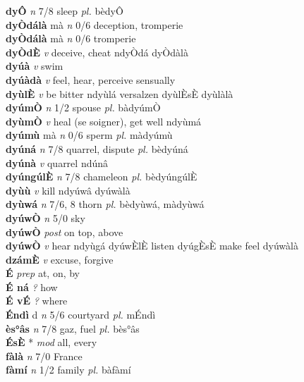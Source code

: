 \documentclass{article}
\newlength\cus
\begin{document}
{\bf dyÔ}  {\it n} 7/8 sleep {\it pl.} bèdyÔ         \\ 
{\bf dyÒdálà} mà {\it n} 0/6 deception, tromperie         \\ 
{\bf dyÒdálà} mà {\it n} 0/6 tromperie         \\ 
{\bf dyÒdÈ}  {\it v} deceive, cheat   ndyÒdá   dyÒdàlà   \\ 
{\bf dyúà}  {\it v} swim         \\ 
{\bf dyúàdà}  {\it v} feel, hear, perceive sensually         \\ 
{\bf dyùlÈ}  {\it v} be bitter   ndyùlá versalzen  dyùlÈsÈ dyùlàlà   \\ 
{\bf dyúmÒ}  {\it n} 1/2 spouse {\it pl.} bàdyúmÒ         \\ 
{\bf dyùmÒ}  {\it v} heal (se soigner), get well   ndyùmá      \\ 
{\bf dyúmù} mà {\it n} 0/6 sperm {\it pl.} màdyúmù         \\ 
{\bf dyúná}  {\it n} 7/8 quarrel, dispute {\it pl.} bèdyúná         \\ 
{\bf dyúnà}  {\it v} quarrel   ndúnâ      \\ 
{\bf dyúngúlÈ}  {\it n} 7/8 chameleon {\it pl.} bèdyúngúlÈ         \\ 
{\bf dyùù}  {\it v} kill   ndyúwâ   dyúwàlà   \\ 
{\bf dyùwá}  {\it n} 7/6, 8 thorn {\it pl.} bèdyùwá, màdyùwá         \\ 
{\bf dyúwÒ}  {\it n} 5/0 sky         \\ 
{\bf dyúwÒ}  {\it post} on top, above         \\ 
{\bf dyúwÒ}  {\it v} hear   ndyùgá dyúwÈlÈ listen dyúgÈsÈ make feel dyúwàlà   \\ 
{\bf dzámÈ}  {\it v} excuse, forgive         \\ 
{\bf É}  {\it prep} at, on, by         \\ 
{\bf É ná}  {\it ?} how         \\ 
{\bf É vÉ}  {\it ?} where         \\ 
{\bf Éndì} d {\it n} 5/6 courtyard {\it pl.} mÉndì         \\ 
{\bf ès°âs}  {\it n} 7/8 gaz, fuel {\it pl.} bès°âs         \\ 
{\bf ÉsÈ} * {\it mod} all, every         \\ 
{\bf fàlà}  {\it n} 7/0 France         \\ 
{\bf fàmí}  {\it n} 1/2 family {\it pl.} bàfàmí         \\ 
\end{document}
